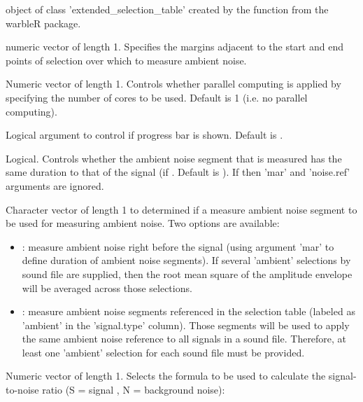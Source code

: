 \documentclass[letterpaper]{book}
\begin{document}
\begin{Arguments}
\begin{ldescription}
\item[\code{X}] object of class 'extended\_selection\_table' created by the function  from the warbleR package.

\item[\code{mar}] numeric vector of length 1. Specifies the margins adjacent to
the start and end points of selection over which to measure ambient noise.

\item[\code{parallel}] Numeric vector of length 1. Controls whether parallel computing is applied by specifying the number of cores to be used. Default is 1 (i.e. no parallel computing).

\item[\code{pb}] Logical argument to control if progress bar is shown. Default is .

\item[\code{eq.dur}] Logical. Controls whether the ambient noise segment that is measured has the same duration 
to that of the signal (if . Default is ). If  then 'mar' and 'noise.ref' arguments are ignored.

\item[\code{noise.ref}] Character vector of length 1 to determined if a measure ambient noise segment to be used for measuring ambient noise. Two options are available: 
\begin{itemize}

\item{} : measure ambient noise right before the signal (using argument 'mar' to define duration of ambient noise segments). If several 'ambient' selections by sound file are supplied, then the root mean square of the amplitude envelope will be averaged across those selections.
\item{} : measure ambient noise segments referenced in the selection table (labeled as 'ambient' in the 'signal.type' column). Those segments will be used to apply the same ambient noise reference to all signals in a sound file. Therefore, at least one 'ambient' selection for each sound file must be provided.

\end{itemize}


\item[\code{type}] Numeric vector of length 1. Selects the formula to be used to calculate the signal-to-noise ratio (S = signal
, N = background noise): 
\begin{itemize}


\end{itemize}
\end{ldescription}
\end{Arguments}
\end{document}
